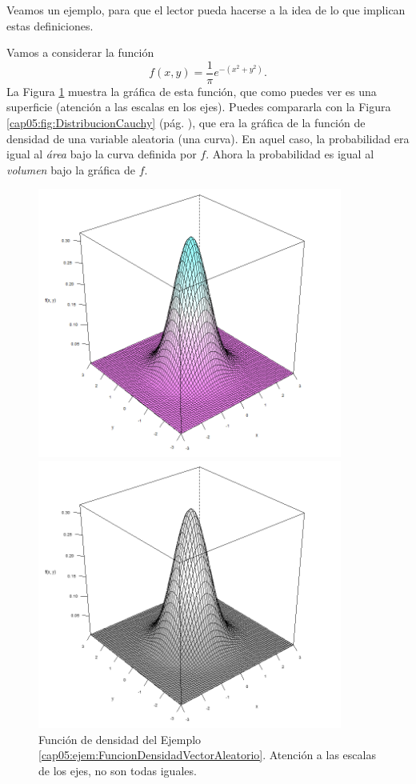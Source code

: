 Veamos un ejemplo, para que el lector pueda hacerse a la idea de lo que implican estas definiciones.
\begin{ejemplo}
\label{cap05:ejem:FuncionDensidadVectorAleatorio}
Vamos a considerar la función
\[
f(x, y)=\dfrac{1}{\pi}e^{-(x^2+y^2)}.
\]
La Figura \ref{cap01:fig:FuncionDensidadVectorAleatorio} muestra la gráfica de esta función, que como puedes ver es una superficie (atención a las escalas en los ejes). Puedes  compararla con la Figura \ref{cap05:fig:DistribucionCauchy} (pág. \pageref{cap05:fig:DistribucionCauchy}), que era la gráfica de la función de densidad de una variable aleatoria (una curva). En aquel caso, la probabilidad era igual al {\em área} bajo la curva definida por $f$. Ahora la probabilidad es igual al {\em volumen} bajo la gráfica de $f$.

  \begin{figure}[hbt]
	\begin{center}
	\begin{enColor}
    \includegraphics[width=10cm]{../fig/Cap05-EjemploFuncionDensidadVectorAleatorio.png}
	\end{enColor}
	\begin{bn}
    \includegraphics[width=10cm]{../fig/Cap05-EjemploFuncionDensidadVectorAleatorio-bn.png}
	\end{bn}
	\caption{Función de densidad del Ejemplo \ref{cap05:ejem:FuncionDensidadVectorAleatorio}.
    Atención a las escalas de los ejes, no son todas iguales.}
	\label{cap01:fig:FuncionDensidadVectorAleatorio}
    \end{center}
  \end{figure}


\end{ejemplo}
